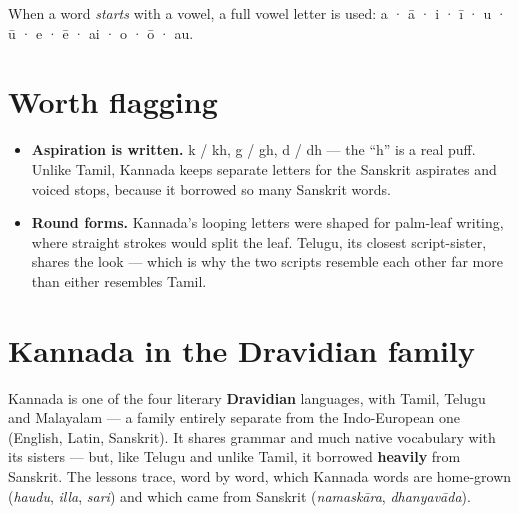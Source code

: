 When a word \emph{starts} with a vowel, a full vowel letter is used: \textbf{} a · \textbf{} ā · \textbf{} i · \textbf{} ī · \textbf{} u · \textbf{} ū · \textbf{} e · \textbf{} ē · \textbf{} ai · \textbf{} o · \textbf{} ō · \textbf{} au.

\section*{Worth flagging}

\begin{itemize}
\raggedright
\setlength{\itemsep}{0.35em}
  \item \textbf{Aspiration is written.}  k /  kh,  g /  gh,  d /  dh — the \textquotedblleft{}h\textquotedblright{} is a real puff. Unlike Tamil, Kannada keeps separate letters for the Sanskrit aspirates and voiced stops, because it borrowed so many Sanskrit words.
  \item \textbf{Round forms.} Kannada's looping letters were shaped for palm-leaf writing, where straight strokes would split the leaf. Telugu, its closest script-sister, shares the look — which is why the two scripts resemble each other far more than either resembles Tamil.
\end{itemize}

\section*{Kannada in the Dravidian family}

Kannada is one of the four literary \textbf{Dravidian} languages, with Tamil, Telugu and Malayalam — a family entirely separate from the Indo-European one (English, Latin, Sanskrit). It shares grammar and much native vocabulary with its sisters — but, like Telugu and unlike Tamil, it borrowed \textbf{heavily} from Sanskrit. The lessons trace, word by word, which Kannada words are home-grown (\emph{haudu}, \emph{illa}, \emph{sari}) and which came from Sanskrit (\emph{namaskāra}, \emph{dhanyavāda}).
